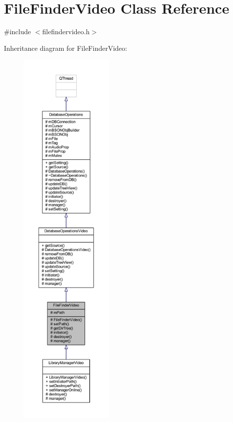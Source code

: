 \hypertarget{class_file_finder_video}{\section{File\-Finder\-Video Class Reference}
\label{class_file_finder_video}
}


{\ttfamily \#include $<$filefindervideo.\-h$>$}



Inheritance diagram for File\-Finder\-Video\-:
\nopagebreak
\begin{figure}[H]
\begin{center}
\leavevmode
\includegraphics[height=550pt]{class_file_finder_video__inherit__graph}
\end{center}
\end{figure}


